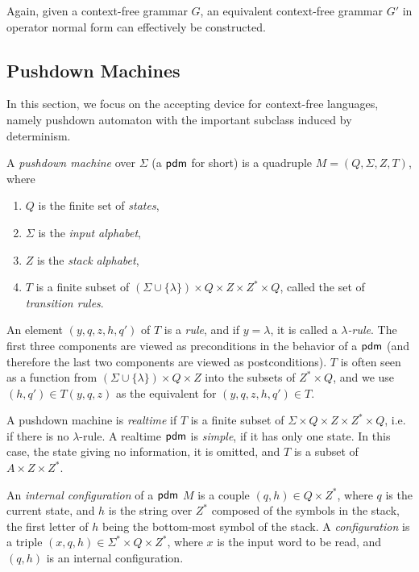 Again, given a context-free grammar $G$, an equivalent context-free grammar $G'$ in operator normal form can effectively be constructed.

\subsection{Pushdown Machines}
\label{subsection:pushdown-machines}

In this section, we focus on the accepting device for context-free languages, namely pushdown automaton with the important subclass induced by determinism.

A \emph{pushdown machine} over $\Sigma$ (a \index{$\pdm$}$\pdm$ for short) is a quadruple $M = (Q, \Sigma, Z, T)$, where

\begin{enumerate}[]
\item $Q$ is the finite set of \emph{states},
\item $\Sigma$ is the \emph{input alphabet},
\item $Z$ is the \emph{stack alphabet},
\item $T$ is a finite subset of $(\Sigma \cup \{\lambda\}) \times Q \times Z \times Z^* \times Q$, called the set of \emph{transition rules}.
\end{enumerate}

An element $(y, q, z, h, q')$ of $T$ is a \emph{rule}, and if $y = \lambda$, it is called a \emph{$\lambda$-rule}. The first three components are viewed as preconditions in the behavior of a \index{$\pdm$}$\pdm$ (and therefore the last two components are viewed as postconditions). $T$ is often seen as a function from $(\Sigma \cup \{\lambda\}) \times Q \times Z$ into the subsets of $Z^* \times Q$, and we use $(h, q') \in T(y, q, z)$ as the equivalent for $(y, q, z, h, q') \in T$.

A pushdown machine is \emph{realtime} if $T$ is a finite subset of $\Sigma \times Q \times Z \times Z^* \times Q$, i.e. if there is no $\lambda$-rule. A realtime \index{$\pdm$}$\pdm$ is \emph{simple}, if it has only one state. In this case, the state giving no information, it is omitted, and $T$ is a subset of $A \times Z \times Z^*$.

An \emph{internal configuration} of a \index{$\pdm$}$\pdm$ $M$ is a couple $(q, h) \in Q \times Z^*$, where $q$ is the current state, and $h$ is the string over $Z^*$ composed of the symbols in the stack, the first letter of $h$ being the bottom-most symbol of the stack. A \emph{configuration} is a triple $(x, q, h) \in \Sigma^* \times Q \times Z^*$, where $x$ is the input word to be read, and $(q, h)$ is an internal configuration.

